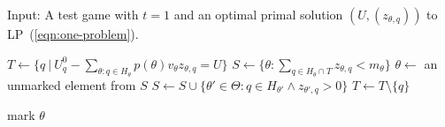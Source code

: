 \documentclass{article}
\begin{document}

\begin{algorithm}
\caption{Input: A test game with $t = 1$ and an optimal primal solution $(U, (z_{\theta,q}))$ to LP~(\ref{eqn:one-problem}).}
\label{alg:one-problem}
\begin{algorithmic}[1]
	\State $T \gets \{q ~|~ U^0_q  - \sum_{\theta: q \in H_\theta}
        p(\theta) v_\theta z_{\theta,q} = U\}$
	\State $S \gets \{\theta : \sum_{q \in H_\theta \cap T} z_{\theta,q} < m_\theta\}$
	\label{line:first-potential}
		\State $\theta \gets $ an unmarked element from $S$
			\State $S \gets S \cup \{\theta' \in \Theta: q \in
                        H_{\theta'} \wedge z_{\theta', q}>0\}$
			\State $T \gets T \setminus \{q\}$\label{line:delete-a}

				\label{line:second-potential}
			\label{line:second-push}
		\EndFor
	\State mark $\theta$
	\EndWhile
	\State {}
\end{algorithmic}
\end{algorithm}
\end{document}
